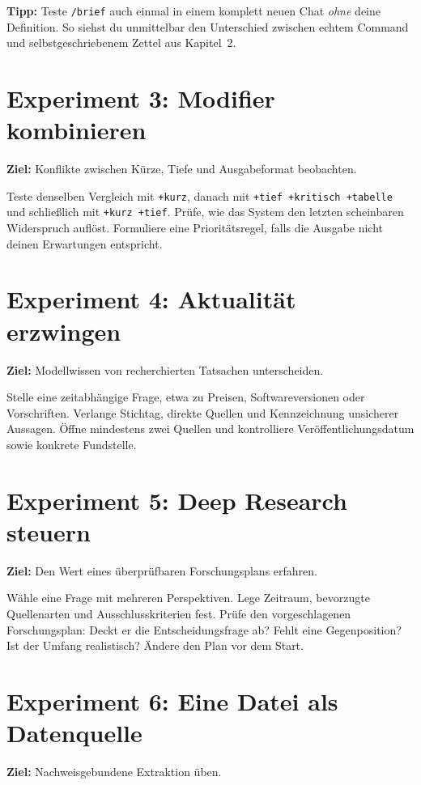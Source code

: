 \textbf{Tipp:} Teste \texttt{/brief} auch einmal in einem komplett neuen Chat \emph{ohne} deine Definition. So siehst du unmittelbar den Unterschied zwischen echtem Command und selbstgeschriebenem Zettel aus Kapitel~2.

\section{Experiment 3: Modifier kombinieren}

\textbf{Ziel:} Konflikte zwischen Kürze, Tiefe und Ausgabeformat beobachten.

Teste denselben Vergleich mit \texttt{+kurz}, danach mit \texttt{+tief +kritisch +tabelle} und schließlich mit \texttt{+kurz +tief}. Prüfe, wie das System den letzten scheinbaren Widerspruch auflöst. Formuliere eine Prioritätsregel, falls die Ausgabe nicht deinen Erwartungen entspricht.

\section{Experiment 4: Aktualität erzwingen}

\textbf{Ziel:} Modellwissen von recherchierten Tatsachen unterscheiden.

Stelle eine zeitabhängige Frage, etwa zu Preisen, Softwareversionen oder Vorschriften. Verlange Stichtag, direkte Quellen und Kennzeichnung unsicherer Aussagen. Öffne mindestens zwei Quellen und kontrolliere Veröffentlichungsdatum sowie konkrete Fundstelle.

\section{Experiment 5: Deep Research steuern}

\textbf{Ziel:} Den Wert eines überprüfbaren Forschungsplans erfahren.

Wähle eine Frage mit mehreren Perspektiven. Lege Zeitraum, bevorzugte Quellenarten und Ausschlusskriterien fest. Prüfe den vorgeschlagenen Forschungsplan: Deckt er die Entscheidungsfrage ab? Fehlt eine Gegenposition? Ist der Umfang realistisch? Ändere den Plan vor dem Start.

\section{Experiment 6: Eine Datei als Datenquelle}

\textbf{Ziel:} Nachweisgebundene Extraktion üben.

